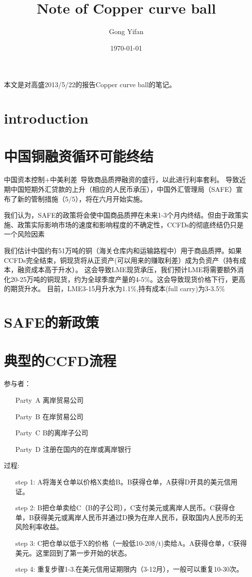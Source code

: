 \documentclass{article}
\title{Note of Copper curve ball}
\author{Gong Yifan}
\date{\today}
\begin{document}
\maketitle
\tableofcontents
本文是对高盛2013/5/22的报告Copper curve ball的笔记。\par
\section{introduction}


\section{中国铜融资循环可能终结}
中国资本控制+中美利差~导致商品质押融资的盛行，以此进行利率套利。
导致近期中国短期外汇贷款的上升（相应的人民币承压），中国外汇管理局（SAFE）宣布了新的管制措施（5/5），将在六月开始实施。\par
我们认为，SAFE的政策将会使中国商品质押在未来1-3个月内终结。但由于政策实施、政策实际影响市场的速度和影响程度的不确定性，CCFDs的彻底终结仍只是一个风险因素\par
我们估计中国约有51万吨的铜（海关仓库内和运输路程中）用于商品质押。如果CCFDs完全结束，铜现货将从正资产(可以用来的赚取利差）成为负资产（持有成本，融资成本高于升水）。
这会导致LME现货承压，我们预计LME将需要额外消化20-25万吨的铜现货，约为全球季度产量的4-5\%。这会导致现货价格下行，更高的期货升水。
目前，LME3-15月升水为1.1\%,持有成本(full carry)为3-3.5\%\par

\section{SAFE的新政策}

\section{典型的CCFD流程}
参与者：\begin{itemize}
    \item[Party\ A] 离岸贸易公司
    \item[Party\ B] 在岸贸易公司
    \item[Party\ C] B的离岸子公司
    \item[Party\ D] 注册在国内的在岸或离岸银行
\end{itemize}
过程:\begin{itemize}
    \item[step 1:] A将海关仓单以价格X卖给B。B获得仓单，A获得D开具的美元信用证。
    \item[step 2:] B把仓单卖给C（B的子公司），C支付美元或离岸人民币。C获得仓单，B获得美元或离岸人民币并通过D换为在岸人民币，获取国内人民币的无风险利率收益。
    \item[step 3:] C把仓单以低于X的价格（一般低10-20\$/t)卖给A。A获得仓单，C获得美元。这里回到了第一步开始的状态。
    \item[step 4:] 重复步骤1-3.在美元信用证期限内（3-12月），一般可以重复10-30次。
\end{itemize}
\end{document}
